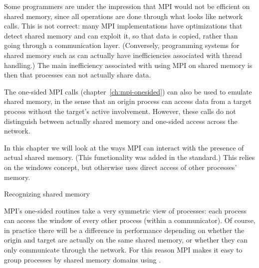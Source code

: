 

Some programmers are under the impression that MPI would not be efficient on
shared memory, since all operations are done through what looks like network calls.
This is not correct: many MPI
implementations have optimizations that detect shared memory and can
exploit it, so that data is copied, rather than going through a communication layer.
(Conversely, programming systems for shared memory such as 
can actually have inefficiencies associated with thread handling.)
The main inefficiency associated with using MPI on shared memory is then
that processes can not actually share data.

The one-sided MPI calls (chapter~\ref{ch:mpi-onesided}) can also be used to
emulate shared memory, in the sense that an origin process can access data
from a target process without the target's active involvement.
However, these calls do not distinguish between actually shared memory
and one-sided access across the network.

In this chapter we will look at the ways MPI
can interact with the presence of actual shared memory. 
(This functionality was added in the  standard.)
This relies on the  windows concept, but
otherwise uses direct access of other processes' memory.

 {Recognizing shared memory}
\label{mpi-comm-split-type}

MPI's one-sided routines take a very symmetric view of processes:
each process can access the window of every other process (within a communicator).
Of course, in practice there will be a difference in performance
depending on whether the origin and target are actually
on the same shared memory, or whether they can only communicate through the network.
For this reason MPI makes it easy to group processes by shared memory domains
using .

